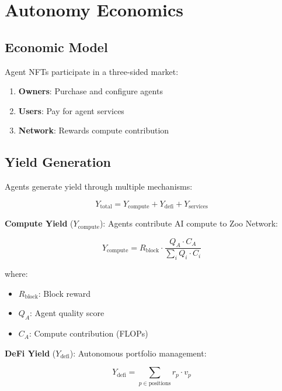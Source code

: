 \documentclass[11pt,letterpaper]{article}
\begin{document}
\section{Autonomy Economics}
\label{sec:economics}

\subsection{Economic Model}

Agent NFTs participate in a three-sided market:

\begin{enumerate}
    \item \textbf{Owners}: Purchase and configure agents
    \item \textbf{Users}: Pay for agent services
    \item \textbf{Network}: Rewards compute contribution
\end{enumerate}

\subsection{Yield Generation}

Agents generate yield through multiple mechanisms:

\begin{equation}
Y_{\text{total}} = Y_{\text{compute}} + Y_{\text{defi}} + Y_{\text{services}}
\end{equation}

\textbf{Compute Yield} ($Y_{\text{compute}}$): Agents contribute AI compute to Zoo Network:

\begin{equation}
Y_{\text{compute}} = R_{\text{block}} \cdot \frac{Q_A \cdot C_A}{\sum_i Q_i \cdot C_i}
\end{equation}

where:
\begin{itemize}
    \item $R_{\text{block}}$: Block reward
    \item $Q_A$: Agent quality score
    \item $C_A$: Compute contribution (FLOPs)
\end{itemize}

\textbf{DeFi Yield} ($Y_{\text{defi}}$): Autonomous portfolio management:

\begin{equation}
Y_{\text{defi}} = \sum_{p \in \text{positions}} r_p \cdot v_p
\end{equation}
\end{document}
